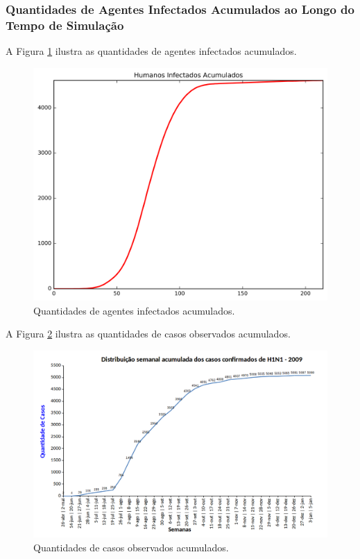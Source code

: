 \newpage

\subsubsection{Quantidades de Agentes Infectados Acumulados ao Longo do Tempo de Simulação}

A Figura \ref{fig:Quantidades_Agentes_Infectados_Acumulado_0003} ilustra as quantidades de agentes infectados acumulados.

\begin{figure}[H]
  \centering
  \includegraphics[width=1.0\textwidth]{Figuras/Resultados/0003/Saidas/MonteCarlo_0/Quantidades_Humanos_Novo_Total.png}
  \caption{Quantidades de agentes infectados acumulados.}
  \label{fig:Quantidades_Agentes_Infectados_Acumulado_0003}
\end{figure}

A Figura \ref{fig:Casos_Observados_Acumulados_0003} ilustra as quantidades de casos observados acumulados.

\begin{figure}[H]
  \centering
  \includegraphics[width=1.0\textwidth]{Figuras/Resultados/Observado/Casos_Observados_Acumulados.png}
  \caption{Quantidades de casos observados acumulados.}
  \label{fig:Casos_Observados_Acumulados_0003}
\end{figure}

